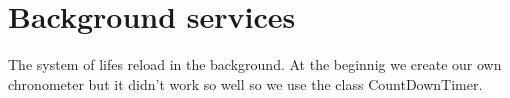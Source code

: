 \section{Background services}
The system of lifes reload in the background. At the beginnig we create our own chronometer but it didn't work so well so we use the class CountDownTimer.